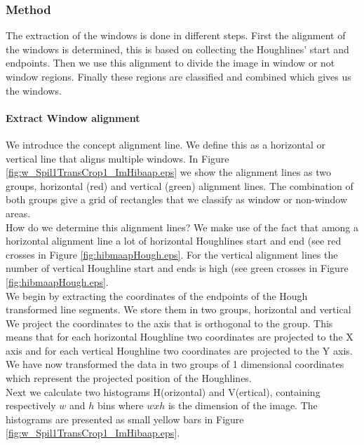 \subsubsection{Method}
The extraction of the windows is done in different steps. 
First the alignment of the windows is determined, this is based on collecting
the Houghlines' start and endpoints. Then we use this alignment to divide the
image in window or not window regions.  Finally these regions are classified
and combined which gives us the windows.


\paragraph{Extract Window alignment}
We introduce the concept alignment line. We define this as a horizontal or
vertical line that aligns multiple windows. In Figure
\ref{fig:w_Spil1TransCrop1_ImHibaap.eps}
we show the alignment lines as two groups, horizontal (red) and
vertical (green) alignment lines.  The combination of both groups give a grid of
rectangles that we classify as window or non-window areas.\\

How do we determine this alignment lines? We make use of the fact that among a
horizontal alignment line a lot of horizontal Houghlines start and end (see red
crosses in Figure \ref{fig:hibmaapHough.eps}. For the vertical alignment lines
the number of vertical Houghline start and ends is high (see green crosses in
Figure \ref{fig:hibmaapHough.eps}.\\

We begin by extracting the coordinates of the endpoints of the Hough transformed line
segments. We store them in two groups, horizontal and vertical%
We project the coordinates to the axis that is orthogonal to the group. This
means that for each horizontal Houghline two coordinates are projected to the X
axis and for each vertical Houghline two coordinates are projected to the Y
axis. We have now transformed the data in two groups of 1 dimensional
coordinates which represent the projected position of the Houghlines.\\

Next we calculate two histograms H(orizontal) and V(ertical), containing respectively
$w$ and $h$ bins where $w x h$ is the dimension of the image.  The histograms
are presented as small yellow bars in Figure \ref{fig:w_Spil1TransCrop1_ImHibaap.eps}.

